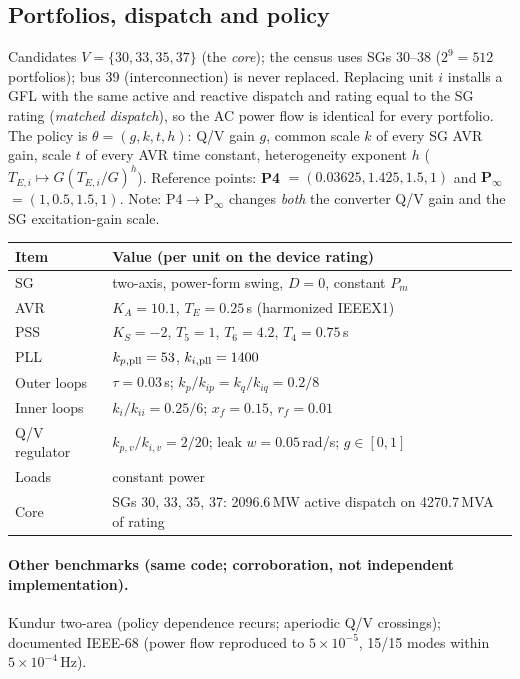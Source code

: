 \documentclass[10pt,a4paper]{article}
\theoremstyle{definition}
\begin{document}
\subsection{Portfolios, dispatch and policy}
Candidates $V=\{30,33,35,37\}$ (the \emph{core}); the census uses SGs 30--38 ($2^9=512$ portfolios);
bus 39 (interconnection) is never replaced. Replacing unit $i$ installs a GFL with the same active and
reactive dispatch and rating equal to the SG rating (\emph{matched dispatch}), so the AC power flow is
identical for every portfolio. The policy is $\theta=(g,k,t,h)$: Q/V gain $g$, common scale $k$ of every
SG AVR gain, scale $t$ of every AVR time constant, heterogeneity exponent $h$
($T_{E,i}\mapsto G(T_{E,i}/G)^h$). Reference points: \textbf{P4} $=(0.03625,1.425,1.5,1)$ and
\textbf{P$_\infty$} $=(1,0.5,1.5,1)$. Note: P4$\to$P$_\infty$ changes \emph{both} the converter Q/V gain
and the SG excitation-gain scale.

\begin{center}
\small
\begin{tabular}{@{}lL{0.68\textwidth}@{}}
\toprule
Item & Value (per unit on the device rating)\\
\midrule
SG & two-axis, power-form swing, $D=0$, constant $P_m$\\
AVR & $K_A=10.1$, $T_E=0.25$\,s (harmonized IEEEX1)\\
PSS & $K_S=-2$, $T_5=1$, $T_6=4.2$, $T_4=0.75$\,s\\
PLL & $k_{p,\rm pll}=53$, $k_{i,\rm pll}=1400$\\
Outer loops & $\tau=0.03$\,s; $k_p/k_{ip}=k_q/k_{iq}=0.2/8$\\
Inner loops & $k_i/k_{ii}=0.25/6$; $x_f=0.15$, $r_f=0.01$\\
Q/V regulator & $k_{p,v}/k_{i,v}=2/20$; leak $w=0.05$\,rad/s; $g\in[0,1]$\\
Loads & constant power\\
Core & SGs 30, 33, 35, 37: 2096.6\,MW active dispatch on 4270.7\,MVA of rating\\
\bottomrule
\end{tabular}
\end{center}

\paragraph{Other benchmarks (same code; corroboration, not independent implementation).}
Kundur two-area (policy dependence recurs; aperiodic Q/V crossings); documented IEEE-68
(power flow reproduced to $5\times10^{-5}$, 15/15 modes within $5\times10^{-4}$\,Hz).
\end{document}
